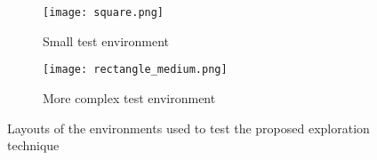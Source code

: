 \begin{figure}[t]
	\centering
	\begin{subfigure}{0.49\textwidth}
	\centering
	\texttt{[image: square.png]}
	\caption{Small test environment\label{fig:square_map}}
	\end{subfigure}
		
	\vspace*{0.1in}
		
	\begin{subfigure}{0.49\textwidth}
	\centering
	\texttt{[image: rectangle\_medium.png]}
	\caption{More complex test environment\label{fig:rectangle_medium_map}}
	\end{subfigure}
	\caption{Layouts of the environments used to test the proposed exploration technique \label{fig:maps}}
\end{figure}

